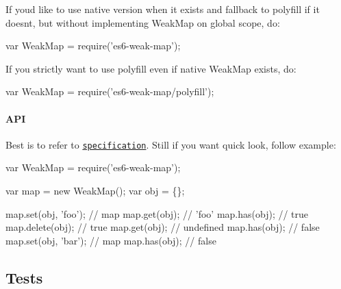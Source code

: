 If you\textquotesingle{}d like to use native version when it exists and fallback to polyfill if it doesn\textquotesingle{}t, but without implementing {\ttfamily Weak\+Map} on global scope, do\+:


\begin{DoxyCode}
var WeakMap = require('es6-weak-map');
\end{DoxyCode}


If you strictly want to use polyfill even if native {\ttfamily Weak\+Map} exists, do\+:


\begin{DoxyCode}
var WeakMap = require('es6-weak-map/polyfill');
\end{DoxyCode}


\paragraph*{A\+PI}

Best is to refer to \href{http://people.mozilla.org/~jorendorff/es6-draft.html#sec-weakmap-objects}{\tt specification}. Still if you want quick look, follow example\+:


\begin{DoxyCode}
var WeakMap = require('es6-weak-map');

var map = new WeakMap();
var obj = \{\};

map.set(obj, 'foo'); // map
map.get(obj);        // 'foo'
map.has(obj);        // true
map.delete(obj);     // true
map.get(obj);        // undefined
map.has(obj);        // false
map.set(obj, 'bar'); // map
map.has(obj);        // false
\end{DoxyCode}


\subsection*{Tests \href{https://travis-ci.org/medikoo/es6-weak-map}{\tt }}

 